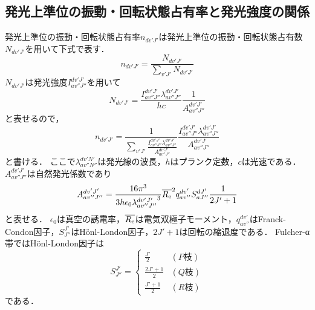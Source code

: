 \subsection{発光上準位の振動・回転状態占有率と発光強度の関係}
発光上準位の振動・回転状態占有率$n_{dv'J'}$は発光上準位の振動・回転状態占有数$N_{dv'J'}$を用いて下式で表す．
\begin{equation}
    n_{dv'J'} = \frac{N_{dv'J'}}{\sum_{v'J'} N_{dv'J'}}
\end{equation}
$N_{dv'J'}$は発光強度$I^{dv'J'}_{av''J''}$を用いて
\begin{equation}
    N_{dv'J'}=\frac{I^{dv'J'}_{av''J''}\lambda^{dv'J'}_{av''J''}}{hc}\frac{1}{A^{dv'J'}_{av''J''}}
\end{equation}
と表せるので，
\begin{equation}
    n_{dv'J'} = \frac{1}{\sum_{v'J'} \frac{I^{dv'J'}_{av''J''}\lambda^{dv'J'}_{av''J''}}{A^{dv'J'}_{av''J''}}} \frac{I^{dv'J'}_{av''J''}\lambda^{dv'J'}_{av''J''}}{A^{dv'J'}_{av''J''}}
\end{equation}
と書ける．
ここで$\lambda^{dv'N'}_{av''N''}$は発光線の波長，$h$はプランク定数，$c$は光速である．
$A^{dv'J'}_{av''J''}$は自然発光係数であり
\begin{equation}
    A^{dv'J'}_{av''J''} = \frac{16 \pi^3}{3h \epsilon_0 {\lambda^{dv'J'}_{av''J''}}^3 } \overline{R_{\rm e}}^2 q^{dv'}_{av''} S^{dJ'}_{aJ''} \frac{1}{2J'+1}
\end{equation}
と表せる\cite{PRnoijousei}．
$\epsilon_0$は真空の誘電率，$\overline{R_{\rm e}}$は電気双極子モーメント，$q^{dv'}_{av''}$はFranck-Condon因子，$S^{J'}_{J''}$はH\"{o}nl-London因子，$2J'+1$は回転の縮退度である．
Fulcher-α帯ではH\"{o}nl-London因子は
\begin{equation}
    S^{J'}_{J''} = \begin{cases}
        \frac{J'}{2} & (P枝)\\
        \frac{2J'+1}{2} & (Q枝)\\
        \frac{J'+1}{2} & (R枝)
    \end{cases}
\end{equation}
である\cite{PRnoijousei}．


